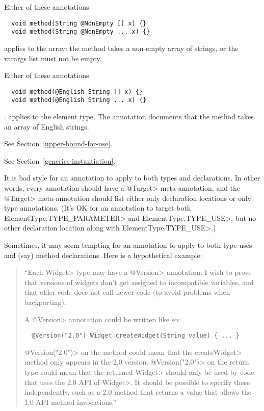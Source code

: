 Either of these annotations

\begin{Verbatim}
  void method(String @NonEmpty [] x) {}
  void method(String @NonEmpty ... x) {}
\end{Verbatim}

\noindent
applies to the array:  the method takes a non-empty array of strings, or
the varargs list must not be empty.

Either of these annotations

\begin{Verbatim}
  void method(@English String [] x) {}
  void method(@English String ... x) {}
\end{Verbatim}

\noindent.
applies to the element type. The annotation documents that the method takes an array of English strings.



See Section~\ref{upper-bound-for-use}.



See Section~\ref{generics-instantiation}.



It is bad style for an annotation to apply to both types and declarations.
In other words, every annotation should have a \<@Target> meta-annotation,
and the \<@Target> meta-annotation should list either only declaration
locations or only type annotations.  (It's OK for an annotation to target
both \<ElementType.TYPE\_PARAMETER> and \<ElementType.TYPE\_USE>, but no
other declaration location along with \<ElementType.TYPE\_USE>.)

Sometimes, it may seem tempting for an annotation to apply to both type
uses and (say) method declarations.  Here is a hypothetical example:

\begin{quote}
  ``Each \<Widget> type may have a \<@Version> annotation.
  I wish to prove that versions of widgets don't get assigned to
  incompatible variables, and that older code does not call newer code (to
  avoid problems when backporting).

  A \<@Version> annotation could be written like so:

\begin{Verbatim}
  @Version("2.0") Widget createWidget(String value) { ... }
\end{Verbatim}

\<@Version("2.0")> on the method could mean that the \<createWidget> method
only appears in the 2.0 version.  \<@Version("2.0")> on the return type
could mean that the returned \<Widget> should only be used by code that
uses the 2.0 API of \<Widget>.  It should be possible to specify these
independently, such as a 2.0 method that returns a value that allows the
1.0 API method invocations.''
\end{quote}

